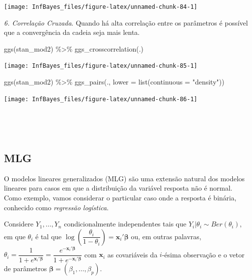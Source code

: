 \documentclass[
]{book}
\newenvironment{Shaded}{\begin{snugshade}}{\end{snugshade}}
\newcommand{\AttributeTok}[1]{\textcolor[rgb]{0.77,0.63,0.00}{#1}}
\newcommand{\FunctionTok}[1]{\textcolor[rgb]{0.00,0.00,0.00}{#1}}
\newcommand{\NormalTok}[1]{#1}
\newcommand{\SpecialCharTok}[1]{\textcolor[rgb]{0.00,0.00,0.00}{#1}}
\newcommand{\StringTok}[1]{\textcolor[rgb]{0.31,0.60,0.02}{#1}}
\begin{document}
\begin{center}\texttt{[image: InfBayes\_files/figure-latex/unnamed-chunk-84-1]} \end{center}

\emph{6. Correlação Cruzada}. Quando há alta correlação entre os parâmetros é possível que a convergência da cadeia seja mais lenta.

\begin{Shaded}
\begin{Highlighting}[]
\FunctionTok{ggs}\NormalTok{(stan\_mod2) }\SpecialCharTok{\%\textgreater{}\%} \FunctionTok{ggs\_crosscorrelation}\NormalTok{(.)}
\end{Highlighting}
\end{Shaded}

\begin{center}\texttt{[image: InfBayes\_files/figure-latex/unnamed-chunk-85-1]} \end{center}

\begin{Shaded}
\begin{Highlighting}[]
\FunctionTok{ggs}\NormalTok{(stan\_mod2) }\SpecialCharTok{\%\textgreater{}\%} \FunctionTok{ggs\_pairs}\NormalTok{(., }\AttributeTok{lower =} \FunctionTok{list}\NormalTok{(}\AttributeTok{continuous =} \StringTok{"density"}\NormalTok{))}
\end{Highlighting}
\end{Shaded}

\begin{center}\texttt{[image: InfBayes\_files/figure-latex/unnamed-chunk-86-1]} \end{center}

\(~\)

\(~\)

\hypertarget{mlg}{%
\subsection{MLG}\label{mlg}}

O modelos lineares generalizados (MLG) são uma extensão natural dos modelos lineares para casos em que a distribuição da variável resposta não é normal. Como exemplo, vamos considerar o particular caso onde a resposta é binária, conhecido como \emph{regressão logística}.

Considere \(Y_1,\ldots,Y_n\) condicionalmente independentes tais que \(Y_i|\theta_i \sim \textit{Ber}(\theta_i)\), em que \(\theta_i\) é tal que \(\log\left(\dfrac{\theta_i}{1-\theta_i}\right) = \boldsymbol x_i' \boldsymbol\beta\) ou, em outras palavras, \(\theta_i = \dfrac{1}{1+e^{\boldsymbol x_i' \boldsymbol\beta}} = \dfrac{e^{-\boldsymbol x_i' \boldsymbol\beta}}{1+e^{-\boldsymbol x_i' \boldsymbol\beta}}\) com \(\boldsymbol x_i\) as covariáveis da \(i\)-ésima observação e o vetor de parâmetros \(\boldsymbol\beta=(\beta_1,\ldots,\beta_p)\).
\end{document}
